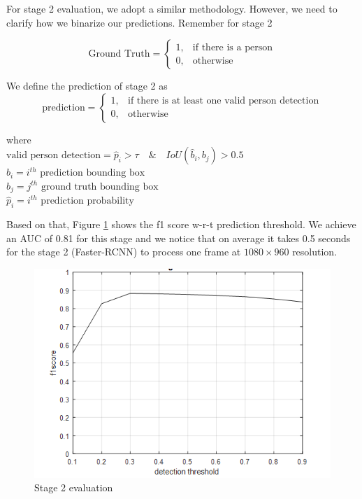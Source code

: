 For stage 2 evaluation, we adopt a similar methodology. However, we need to clarify how we binarize our predictions. Remember for stage 2

$$
\text{Ground Truth} = 
\begin{cases}
1, &    \text{if there is a person} \\
0, &    \text{otherwise}
\end{cases}
$$

We define the prediction of stage 2 as 
$$
\text{prediction} = 
\begin{cases}
1, &    \text{if there is at least one valid person detection} \\
0, &    \text{otherwise}
\end{cases}
$$

where \\
$\text{valid person detection} = \hat{p}_i>\tau \quad \& \quad IoU(\hat{b}_i,b_j)>0.5$ \\
$\hat{b}_i =i^{th} \text{ prediction bounding box}$ \\
$b_j =j^{th} \text{ ground truth bounding box}$ \\
$\hat{p}_i = i^{th} \text{ prediction probability}$

Based on that, Figure \ref{fig:f1-analysis-s2} shows the f1 score w-r-t prediction threshold. We achieve an AUC of 0.81 for this stage and we notice that on average it takes 0.5 seconds for the stage 2 (Faster-RCNN) to process one frame at $1080 \times 960$ resolution. 

\begin{figure}
    \centering
    \includegraphics[width=\linewidth]{images/f1-analysis-s2.png}
    \caption{Stage 2 evaluation}
    \label{fig:f1-analysis-s2}
\end{figure}

